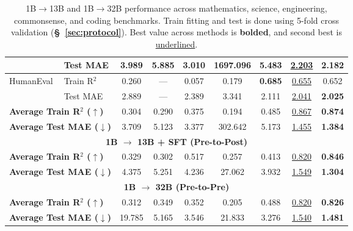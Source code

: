 \begin{table}[bt!]
{\begin{tabular}{llcccccc>{\columncolor{gray!15}}c}
& Test MAE & 3.989 & 5.885 & 3.010 & 1697.096 & 5.483 & \underline{2.203} & \textbf{2.182} \\
\midrule
\multirow{2}{*}{HumanEval} & Train R$^2$ & 0.260 & --- & 0.057 & 0.179 & \textbf{0.685} & \underline{0.655} & 0.652 \\
& Test MAE & 2.889 & --- & 2.389 & 3.341 & 2.111 & \underline{2.041} & \textbf{2.025} \\
\midrule
\multicolumn{2}{l}{\textbf{Average Train R$^2$ ($\uparrow$)}} & 0.304 & 0.290 & 0.375 & 0.194 & 0.485 & \underline{0.867} & \textbf{0.874} \\
\multicolumn{2}{l}{\textbf{Average Test MAE ($\downarrow$)}} & 3.709 & 5.123 & 3.377 & 302.642 & 5.173 & \underline{1.455} & \textbf{1.384} \\
\midrule
\multicolumn{9}{c}{\cellcolor{mybrown!30}\textbf{1B $\rightarrow$ 13B + SFT (Pre-to-Post)}} \\
\midrule
\multicolumn{2}{l}{\textbf{Average Train R$^2$ ($\uparrow$)}} & 0.329 & 0.302 & 0.517 & 0.257 & 0.413 & \underline{0.820} & \textbf{0.846} \\
\multicolumn{2}{l}{\textbf{Average Test MAE ($\downarrow$)}} & 4.375 & 5.251 & 4.236 & 27.062 & 3.932 & \underline{1.549} & \textbf{1.304} \\
\midrule
\multicolumn{9}{c}{\cellcolor{mybrown!30}\textbf{1B $\rightarrow$ 32B (Pre-to-Pre)}} \\
\midrule
\multicolumn{2}{l}{\textbf{Average Train R$^2$ ($\uparrow$)}} & 0.312 & 0.349 & 0.352 & 0.205 & 0.488 & \underline{0.820} & \textbf{0.826} \\
\multicolumn{2}{l}{\textbf{Average Test MAE ($\downarrow$)}} & 19.785 & 5.165 & 3.546 & 21.833 & 3.276 & \underline{1.540} & \textbf{1.481} \\
\bottomrule
\end{tabular}
}
\caption{1B$\rightarrow$13B and 1B$\rightarrow$32B performance across mathematics, science, engineering, commonsense, and coding benchmarks. Train fitting and test is done using 5-fold cross validation (\textbf{\S\ \ref{sec:protocol}}). Best value across methods is \textbf{bolded}, and second best is \underline{underlined}.}\label{tab:main_tab}
\end{table}



